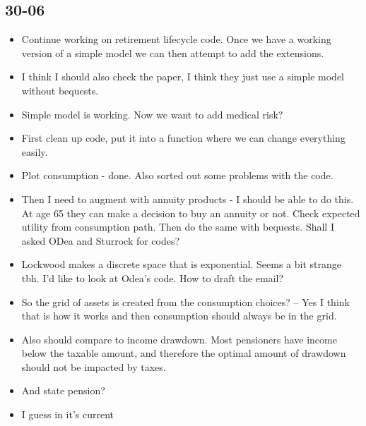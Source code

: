 \documentclass[12pt]{article}
\begin{document}
\subsection{\textbf{30-06}}
\begin{itemize}


      \item Continue working on retirement lifecycle code.
            Once we have a working version of a simple model we can then attempt
            to add the extensions.

      \item I think I should also check the \cite{odea_sturrock_rest_2023} paper,
            I think they just use a simple model without bequests.

      \item Simple model is working. Now we want to add medical risk?
      \item First clean up code, put it into a function where we can change
            everything easily.

      \item Plot consumption - done. Also sorted out some problems with the code.
      \item Then I need to augment with annuity products -
            I should be able to do this. At age 65 they can make a decision to buy an annuity or not.
            Check expected utility from consumption path.
            Then do the same with bequests.
            Shall I asked ODea and Sturrock for codes?

      \item Lockwood makes a discrete space that is exponential.
            Seems a bit strange tbh. I'd like to look at Odea's code.
            How to draft the email?

      \item So the grid of assets is created from the consumption choices?
            -- Yes I think that is how it works and then consumption should always be in the grid.


      \item Also should compare to income drawdown. Most pensioners have income
            below the taxable amount, and therefore the optimal amount of drawdown
            should not be impacted by taxes.
      \item And state pension?
      \item I guess in it's current

\end{itemize}
\end{document}
